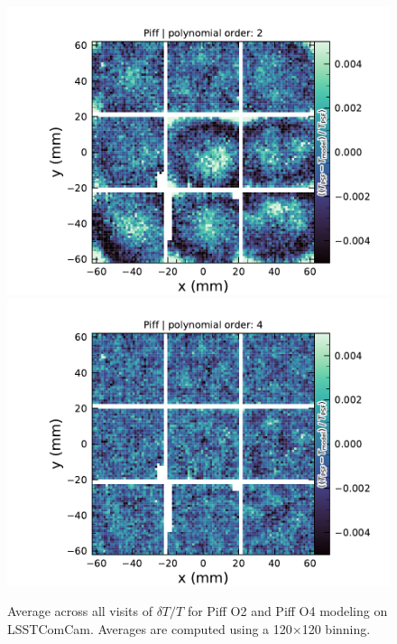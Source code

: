 \begin{figure}[htb!]
    \centering
    \includegraphics[width=0.8\columnwidth]{dT_T_Piff_poly_order_2}  %
    \vspace{0.5cm}  %
    \includegraphics[width=0.8\columnwidth]{dT_T_Piff_poly_order_4}  %
    \caption{Average across all visits of $\delta T/T$  for Piff O2 and Piff O4 modeling on LSSTComCam. Averages are computed using a 120$\times$120 binning.}
    \label{fig:psf_residuals_fov}
\end{figure}

